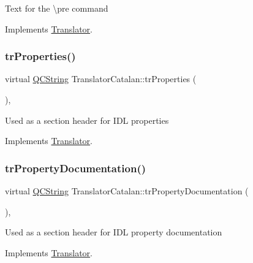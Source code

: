 Text for the \textbackslash{}pre command 

Implements \mbox{\hyperlink{class_translator}{Translator}}.

\mbox{\label{class_translator_catalan_adfef507b9fbd518b65491a82b6216f95}} 
\subsubsection{\texorpdfstring{trProperties()}{trProperties()}}
{\footnotesize\ttfamily virtual \mbox{\hyperlink{class_q_c_string}{Q\+C\+String}} Translator\+Catalan\+::tr\+Properties (\begin{DoxyParamCaption}{ }\end{DoxyParamCaption})\hspace{0.3cm}{\ttfamily [inline]}, {\ttfamily [virtual]}}

Used as a section header for I\+DL properties 

Implements \mbox{\hyperlink{class_translator}{Translator}}.

\mbox{\label{class_translator_catalan_a7364e9c453322e2c426c10238e1e74b5}} 
\subsubsection{\texorpdfstring{trPropertyDocumentation()}{trPropertyDocumentation()}}
{\footnotesize\ttfamily virtual \mbox{\hyperlink{class_q_c_string}{Q\+C\+String}} Translator\+Catalan\+::tr\+Property\+Documentation (\begin{DoxyParamCaption}{ }\end{DoxyParamCaption})\hspace{0.3cm}{\ttfamily [inline]}, {\ttfamily [virtual]}}

Used as a section header for I\+DL property documentation 

Implements \mbox{\hyperlink{class_translator}{Translator}}.

\mbox{\label{class_translator_catalan_a87e159fbce30da0e9fd2ef6bd4d3363e}} 
